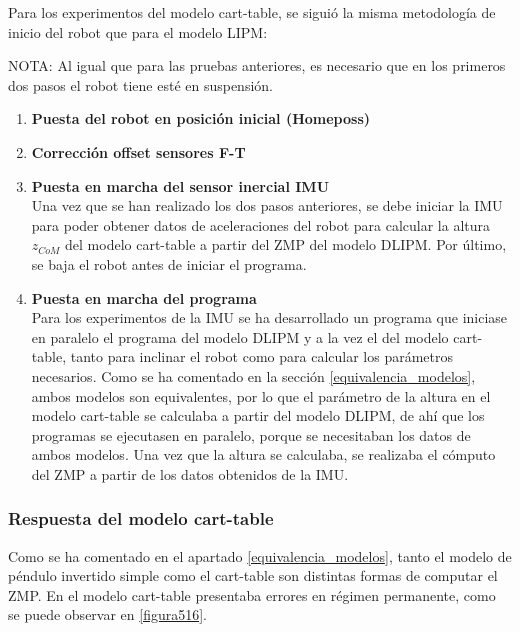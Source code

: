Para los experimentos del modelo cart-table, se siguió la misma metodología de inicio del robot que para el modelo LIPM:

NOTA: Al igual que para las pruebas anteriores, es necesario que en los primeros dos pasos el robot tiene esté en suspensión.

\begin{enumerate}
\item \textbf{Puesta del robot en posición inicial (Homeposs)}

\item \textbf{Corrección offset sensores F-T} 

\item \textbf{Puesta en marcha del sensor inercial IMU}\\ Una vez que se han realizado los dos pasos anteriores, se debe iniciar la IMU para poder obtener datos de aceleraciones del robot para calcular la altura $z_{CoM}$ del modelo cart-table a partir del ZMP del modelo DLIPM. Por último, se baja el robot antes de iniciar el programa.

\item \textbf{Puesta en marcha del programa}\\ Para los experimentos de la IMU se ha desarrollado un programa que iniciase en paralelo el programa del modelo DLIPM y a la vez el del modelo cart-table, tanto para inclinar el robot como para calcular los parámetros necesarios. Como se ha comentado en la sección \ref{equivalencia_modelos}, ambos modelos son equivalentes, por lo que el parámetro de la altura en el modelo cart-table se calculaba a partir del modelo DLIPM, de ahí que los programas se ejecutasen en paralelo, porque se necesitaban los datos de ambos modelos. Una vez que la altura se calculaba, se realizaba el cómputo del ZMP a partir de los datos obtenidos de la IMU. 

\end{enumerate}

\subsubsection{Respuesta del modelo cart-table}

Como se ha comentado en el apartado \ref{equivalencia_modelos}, tanto el modelo de péndulo invertido simple como el cart-table son distintas formas de computar el ZMP. En \cite{ref22} el modelo cart-table presentaba errores en régimen permanente, como se puede observar en \ref{figura516}.

